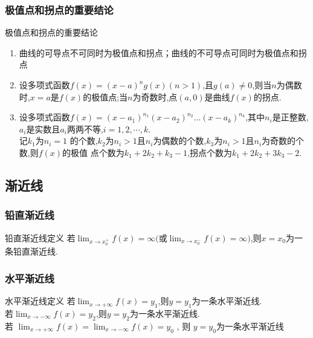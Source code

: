 \documentclass[8pt a4paper, oneside, UTF8]{ctexbook}  %
\begin{document}
\begin{sloppypar}
    \subsubsection{极值点和拐点的重要结论}
    \begin{conclusion}{极值点和拐点的重要结论}{}
        \begin{enumerate}
            \item 曲线的可导点不可同时为极值点和拐点；曲线的不可导点可同时为极值点和拐点
            \item 设多项式函数$f(x)=(x-a)^n g(x)(n>1)$,且$g(a)\neq0$,则当$n$为偶数时,$x=a$是$f(x)$的极值点;当$n$为奇数时,点$(a,0)$是曲线$f(x)$的拐点.
            \item 设多项式函数$f(x)=(x-a_1)^{n_1}(x-a_2)^{n_2}...(x-a_k)^{n_k}$,其中$n_i$是正整数,$a_i$是实数且$a_i$两两不等,$i= 1, 2, \cdots,k$.\\记$k_1$为$n_i=1$ 的个数,$k_2$为$n_i>1$且$n_i$为偶数的个数,$k_3$为$n_i>1$且$n_i$为奇数的个数,则$f(x)$的极值
            点个数为$k_1+2k_2+k_3-1$,拐点个数为$k_1+2k_2+3k_3-2.$
        \end{enumerate}
    \end{conclusion}
    \subsection{渐近线}
    
    \subsubsection{铅直渐近线}  
    \begin{defn}{铅直渐近线定义}{}
        若$\lim_{x\to x_0^+}f(x)=\infty($或$\lim_{x\to x_0^-}f(x)=\infty)$,则$x=x_0$为一条铅直渐近线.
    \end{defn}
    \subsubsection{水平渐近线}
        \begin{defn}{水平渐近线定义}{}
            若$\lim_{x\to+\infty} f(x)=y_{1}$,则$y=y_1$为一条水平渐近线.\\
            若$\lim_{x\to-\infty} f(x)=y_{2}$,则$y=y_{2}$为一条水平渐近线.\\
            ${\text{若 }}\lim _{x\to + \infty }f( x) = \lim _{x\to - \infty }f( x) = y_{0}$ , ${\text{则  }y= y_{0}}$为一条水平渐近线
        \end{defn}

\end{sloppypar}
\end{document}
